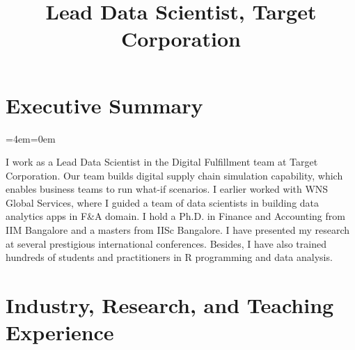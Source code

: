 \documentclass[11pt,a4paper,]{moderncv}
\title{Lead Data Scientist, Target Corporation}
\begin{document}
\makecvtitle



\newenvironment{smallblockquote}{%
  \par%
  \medskip
  \leftskip=2em\rightskip=0em%
  \noindent\ignorespaces}{%
  \par\medskip}

\newenvironment{blockquote}{%
  \par%
  \medskip
  \leftskip=4em\rightskip=0em%
  \noindent\ignorespaces}{%
  \par\medskip}

\hypertarget{executive-summary}{%
\section{Executive Summary}\label{executive-summary}}

\begingroup
\bgroup %
  \par%
  \medskip
  \leftskip=4em\rightskip=0em%
  \noindent\ignorespaces

I work as a Lead Data Scientist in the Digital Fulfillment team at Target Corporation. Our team builds digital supply chain simulation capability, which enables business teams to run what-if scenarios. I earlier worked with WNS Global Services, where I guided a team of data scientists in building data analytics apps in F\&A domain. I hold a Ph.D. in Finance and Accounting from IIM Bangalore and a masters from IISc Bangalore. I have presented my research at several prestigious international conferences. Besides, I have also trained hundreds of students and practitioners in R programming and data analysis.

%
  \par\medskip\egroup 
\endgroup

\hypertarget{industry-research-and-teaching-experience}{%
\section{Industry, Research, and Teaching
Experience}\label{industry-research-and-teaching-experience}}
\end{document}
